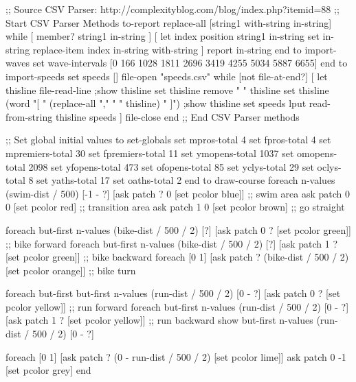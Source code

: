 \documentclass[12pt]{article}
\begin{document}
;; Source CSV Parser: http://complexityblog.com/blog/index.php?itemid=88
;; Start CSV Parser Methods
to-report replace-all [string1 with-string in-string]
  while [ member? string1 in-string ] [
    let index position string1 in-string
    set in-string replace-item index in-string with-string
  ] 
  report in-string
end
to import-waves
  set wave-intervals [0 166 1028 1811 2696 3419 4255 5034 5887 6655]
end
to import-speeds
  set speeds []
  file-open "speeds.csv"
  while [not file-at-end?] [
    let thisline file-read-line
    ;show thisline
    set thisline remove " " thisline
    set thisline (word "[ " (replace-all "," " " thisline) " ]")
    ;show thisline
    set speeds lput read-from-string thisline speeds
  ]
  file-close
end
;; End CSV Parser methods

;; Set global initial values
to set-globals
set mpros-total 4
set fpros-total 4
set mpremiers-total 30
set fpremiers-total 11
set ymopens-total 1037
set omopens-total 2098
set yfopens-total 473
set ofopens-total 85
set yclys-total 29
set oclys-total 8
set yaths-total 17
set oaths-total 2
end
to draw-course
  foreach n-values (swim-dist / 500) [-1 - ?] [ask patch ? 0 [set pcolor blue]] ;; swim area
  ask patch 0 0 [set pcolor red]   ;; transition area
  ask patch 1 0 [set pcolor brown] ;; go straight

  foreach but-first n-values (bike-dist / 500 / 2) [?] [ask patch 0 ? [set pcolor green]]    ;; bike forward
  foreach but-first n-values (bike-dist / 500 / 2) [?] [ask patch 1 ? [set pcolor green]]    ;; bike backward
  foreach [0 1] [ask patch ? (bike-dist / 500 / 2) [set pcolor orange]]                      ;; bike turn
  
  foreach but-first but-first n-values (run-dist / 500 / 2) [0 - ?] [ask patch 0 ? [set pcolor yellow]]    ;; run forward
  foreach but-first n-values (run-dist / 500 / 2) [0 - ?] [ask patch 1 ? [set pcolor yellow]] ;; run backward
  show but-first n-values (run-dist / 500 / 2) [0 - ?]
  
  foreach [0 1] [ask patch ? (0 - run-dist / 500 / 2) [set pcolor lime]]
  ask patch 0 -1 [set pcolor grey]
end
\end{document}
